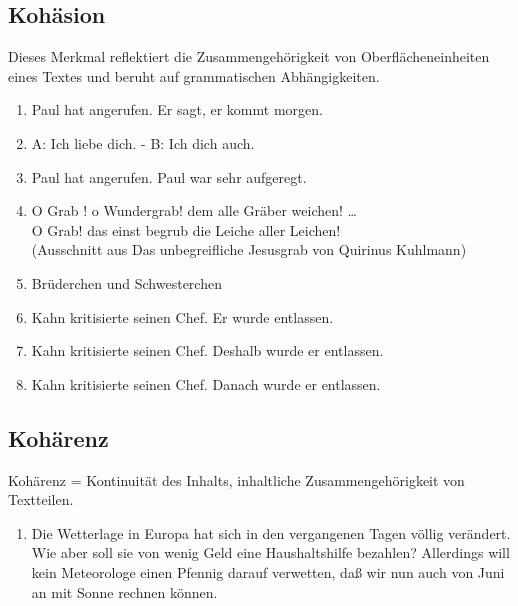 \documentclass[
  letterpaper,
]{scrbook}
\providecommand{\tightlist}{%
  \setlength{\itemsep}{0pt}\setlength{\parskip}{0pt}}\usepackage{longtable,booktabs,array}
\begin{document}
\hypertarget{kohuxe4sion}{%
\subsection{Kohäsion}\label{kohuxe4sion}}

Dieses Merkmal reflektiert die Zusammengehörigkeit von
Oberflächeneinheiten eines Textes und beruht auf grammatischen
Abhängigkeiten.

\begin{enumerate}
\def\labelenumi{(\arabic{enumi})}
\setcounter{enumi}{1}
\tightlist
\item
  Paul hat angerufen. Er sagt, er kommt morgen.\\
\item
  A: Ich liebe dich. - B: Ich dich auch.\\
\item
  Paul hat angerufen. Paul war sehr aufgeregt.\\
\item
  O Grab ! o Wundergrab! dem alle Gräber weichen! \ldots{}\\
  O Grab! das einst begrub die Leiche aller Leichen!\\
  (Ausschnitt aus Das unbegreifliche Jesusgrab von Quirinus Kuhlmann)\\
\item
  Brüderchen und Schwesterchen\\
\item
  Kahn kritisierte seinen Chef. Er wurde entlassen.\\
\item
  Kahn kritisierte seinen Chef. Deshalb wurde er entlassen.\\
\item
  Kahn kritisierte seinen Chef. Danach wurde er entlassen.\\
\end{enumerate}

\hypertarget{kohuxe4renz}{%
\subsection{Kohärenz}\label{kohuxe4renz}}

Kohärenz = Kontinuität des Inhalts, inhaltliche Zusammengehörigkeit von
Textteilen.

\begin{enumerate}
\def\labelenumi{(\arabic{enumi})}
\setcounter{enumi}{9}
\tightlist
\item
  Die Wetterlage in Europa hat sich in den vergangenen Tagen völlig
  verändert. Wie aber soll sie von wenig Geld eine Haushaltshilfe
  bezahlen? Allerdings will kein Meteorologe einen Pfennig darauf
  verwetten, daß wir nun auch von Juni an mit Sonne rechnen können.
\end{enumerate}
\end{document}
